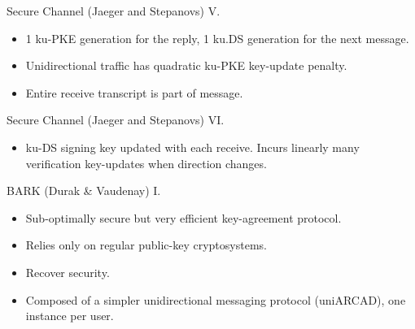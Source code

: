 \documentclass{beamer}
\begin{document}
\begin{frame}{Secure Channel (Jaeger and Stepanovs) V.}
  \scriptsize
  \begin{minipage}[ht]{0.59\textwidth}
      \begin{figure}[ht]
        \centering
        \setlength{\fboxsep}{10pt}
        \scalebox{0.7}{%
        \fbox{%
          
        }
      }
    \end{figure}
    \end{minipage}
  \begin{minipage}[ht]{0.40\textwidth}
      \begin{itemize}
      \item 1 ku-PKE generation for the reply, 1 ku.DS generation for the next message.
      \item Unidirectional traffic has quadratic ku-PKE key-update penalty.
      \item Entire receive transcript is part of message.
      \end{itemize}
    \end{minipage}
\end{frame}

\begin{frame}{Secure Channel (Jaeger and Stepanovs) VI.}
  \scriptsize
  \begin{minipage}[h]{0.65\textwidth}
      \begin{figure}[ht]
        \centering
        \setlength{\fboxsep}{10pt}
        \scalebox{0.7}{%
        \fbox{%
          
        }
      }
    \end{figure}
    \end{minipage}
  \begin{minipage}[h]{0.34\textwidth}
      \begin{itemize}
      \item ku-DS signing key updated with each receive. Incurs
        linearly many verification key-updates when direction changes.
      \end{itemize}
    \end{minipage}
\end{frame}

\begin{frame}{BARK (Durak \& Vaudenay) I.}
  \begin{itemize}
  \item Sub-optimally secure but very efficient key-agreement protocol.
  \item Relies only on regular public-key cryptosystems.
  \item Recover security.
  \item Composed of a simpler unidirectional messaging protocol (uniARCAD),
    one instance per user.
  \end{itemize}
\end{frame}
\end{document}
